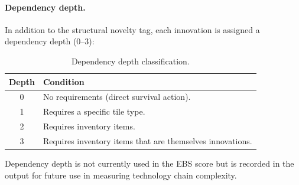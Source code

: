 \documentclass[a4paper, 11pt]{article}
\begin{document}
\paragraph{Dependency depth.} In addition to the structural novelty tag, each innovation is assigned a dependency depth (0--3):

\begin{table}[ht]
\centering
\caption{Dependency depth classification.}
\begin{tabular}{@{}cl@{}}
\toprule
\textbf{Depth} & \textbf{Condition} \\
\midrule
0 & No requirements (direct survival action). \\
1 & Requires a specific tile type. \\
2 & Requires inventory items. \\
3 & Requires inventory items that are themselves innovations. \\
\bottomrule
\end{tabular}
\end{table}

\noindent Dependency depth is not currently used in the EBS score but is recorded in the output for future use in measuring technology chain complexity.

\end{document}
